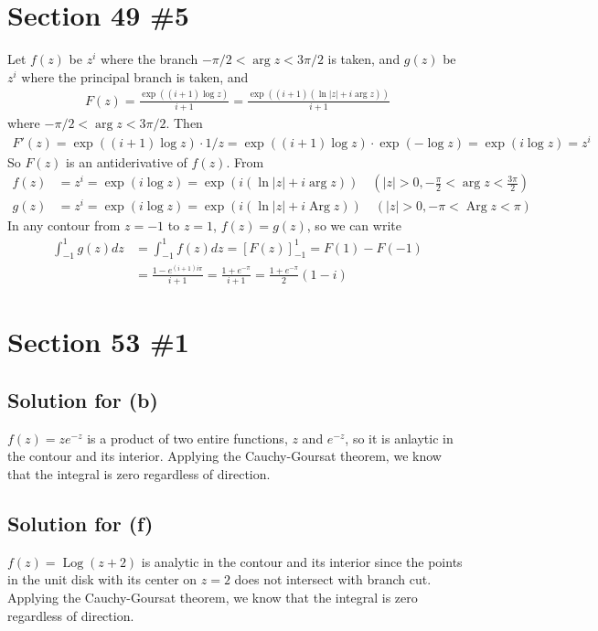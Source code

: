 \documentclass{scrartcl}
\begin{document}
\section{Section 49 \#5}
Let \(f(z)\) be \(z^i\) where the branch \(-\pi / 2 < \arg z < 3\pi / 2\) is taken, and \(g(z)\) be \(z^i\) where the principal branch is taken, and
\begin{align*}
  F(z) = \frac{\exp((i + 1) \log z)}{i + 1} = \frac{\exp((i + 1) (\ln |z| + i\arg z))}{i + 1}
\end{align*}
where \(-\pi / 2 < \arg z < 3\pi / 2\).
Then
\begin{align*}
  F'(z) = \exp((i + 1) \log z) \cdot 1 / z = \exp((i + 1) \log z) \cdot \exp(-\log z) = \exp(i \log z) = z^i
\end{align*}
So \(F(z)\) is an antiderivative of \(f(z)\).
From
\begin{align*}
  f(z) &= z^i = \exp(i \log z) = \exp(i (\ln |z| + i\arg z)) \quad \left( |z| > 0, -\frac{\pi}{2} < \arg z < \frac{3\pi}{2} \right) \\
  g(z) &= z^i = \exp(i \log z) = \exp(i (\ln |z| + i\operatorname{Arg} z)) \quad \left( |z| > 0, -\pi < \operatorname{Arg} z < \pi \right)
\end{align*}
In any contour from \(z = -1\) to \(z = 1\), \(f(z) = g(z)\), so we can write
\begin{align*}
  \int^1_{-1} g(z) dz &= \int^1_{-1} f(z) dz = \left[ F(z) \right]^1_{-1} = F(1) - F(-1) \\
                      &= \frac{1 - e^{(i + 1) i\pi}}{i + 1} = \frac{1 + e^{-\pi}}{i + 1} = \frac{1 + e^{-\pi}}{2} (1 - i)
\end{align*}

\section{Section 53 \#1}
\subsection{Solution for (b)}
\(f(z) =ze^{-z}\) is a product of two entire functions, \(z\) and \(e^{-z}\), so it is anlaytic in the contour and its interior.
Applying the Cauchy-Goursat theorem, we know that the integral is zero regardless of direction.

\subsection{Solution for (f)}
\(f(z) = \operatorname{Log} (z + 2)\) is analytic in the contour and its interior since the points in the unit disk with its center on \(z = 2\) does not intersect with branch cut.
Applying the Cauchy-Goursat theorem, we know that the integral is zero regardless of direction.
\end{document}

